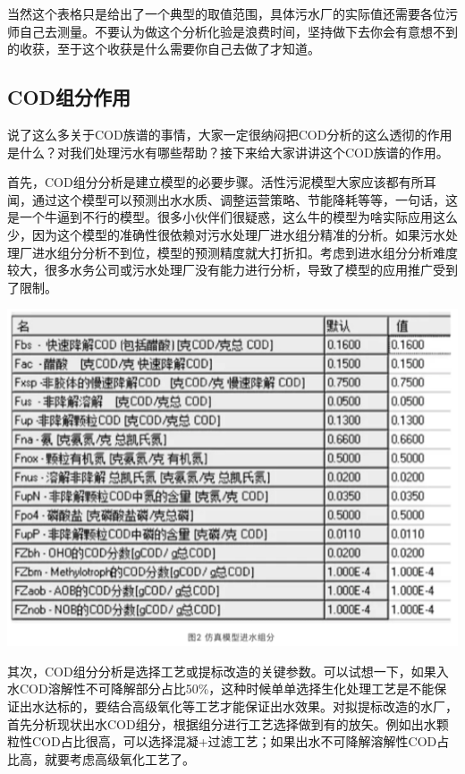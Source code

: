\documentclass[
]{book}
\begin{document}
当然这个表格只是给出了一个典型的取值范围，具体污水厂的实际值还需要各位污师自己去测量。不要认为做这个分析化验是浪费时间，坚持做下去你会有意想不到的收获，至于这个收获是什么需要你自己去做了才知道。

\hypertarget{codux7ec4ux5206ux4f5cux7528}{%
\subsection{COD组分作用}\label{codux7ec4ux5206ux4f5cux7528}}

说了这么多关于COD族谱的事情，大家一定很纳闷把COD分析的这么透彻的作用是什么？对我们处理污水有哪些帮助？接下来给大家讲讲这个COD族谱的作用。

首先，COD组分分析是建立模型的必要步骤。活性污泥模型大家应该都有所耳闻，通过这个模型可以预测出水水质、调整运营策略、节能降耗等等，一句话，这是一个牛逼到不行的模型。很多小伙伴们很疑惑，这么牛的模型为啥实际应用这么少，因为这个模型的准确性很依赖对污水处理厂进水组分精准的分析。如果污水处理厂进水组分分析不到位，模型的预测精度就大打折扣。考虑到进水组分分析难度较大，很多水务公司或污水处理厂没有能力进行分析，导致了模型的应用推广受到了限制。

\includegraphics[width=6.67in]{images/cod4}

其次，COD组分分析是选择工艺或提标改造的关键参数。可以试想一下，如果入水COD溶解性不可降解部分占比50\%，这种时候单单选择生化处理工艺是不能保证出水达标的，要结合高级氧化等工艺才能保证出水效果。对拟提标改造的水厂，首先分析现状出水COD组分，根据组分进行工艺选择做到有的放矢。例如出水颗粒性COD占比很高，可以选择混凝+过滤工艺；如果出水不可降解溶解性COD占比高，就要考虑高级氧化工艺了。
\end{document}
